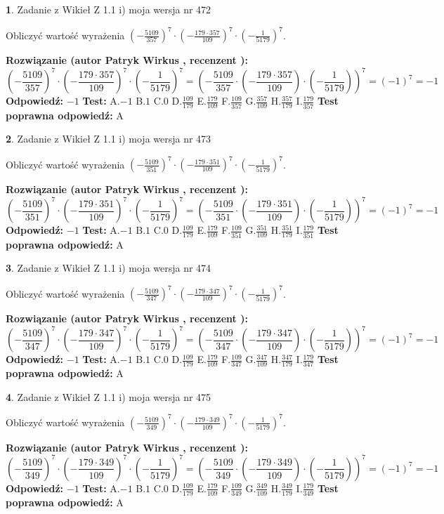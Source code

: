 \documentclass[12pt, a4paper]{article}
\theoremstyle{definition} %
\newtheorem{zad}{}
\newcommand{\zadStart}[1]{\begin{zad}#1\newline}
\newcommand{\zadStop}{\end{zad}}
\newcommand{\rozwStart}[2]{\noindent \textbf{Rozwiązanie (autor #1 , recenzent #2): }\newline}
\newcommand{\rozwStop}{\newline}
\newcommand{\odpStart}{\noindent \textbf{Odpowiedź:}\newline}
\newcommand{\odpStop}{\newline}
\newcommand{\testStart}{\noindent \textbf{Test:}\newline}
\newcommand{\testStop}{\newline}
\newcommand{\kluczStart}{\noindent \textbf{Test poprawna odpowiedź:}\newline}
\newcommand{\kluczStop}{\newline}
\begin{document}
\zadStart{Zadanie z Wikieł Z 1.1 i) moja wersja nr 472}

Obliczyć wartość wyrażenia $(-\frac{5109}{357})^{7} \cdot (-\frac{179 \cdot 357}{109})^{7} \cdot (-\frac{1}{5179})^{7}$.
\zadStop
\rozwStart{Patryk Wirkus}{}
$$(-\frac{5109}{357})^{7} \cdot (-\frac{179 \cdot 357}{109})^{7} \cdot (-\frac{1}{5179})^{7} = (-\frac{5109}{357} \cdot (-\frac{179 \cdot 357}{109}) \cdot (-\frac{1}{5179}))^{7} = (-1)^{7} = -1$$
\rozwStop
\odpStart
$-1$
\odpStop
\testStart
A.$-1$ B.$1$ C.$0$ D.$\frac{109}{179}$ E.$\frac{179}{109}$
F.$\frac{109}{357}$ G.$\frac{357}{109}$
H.$\frac{357}{179}$
I.$\frac{179}{357}$
\testStop
\kluczStart
A
\kluczStop



\zadStart{Zadanie z Wikieł Z 1.1 i) moja wersja nr 473}

Obliczyć wartość wyrażenia $(-\frac{5109}{351})^{7} \cdot (-\frac{179 \cdot 351}{109})^{7} \cdot (-\frac{1}{5179})^{7}$.
\zadStop
\rozwStart{Patryk Wirkus}{}
$$(-\frac{5109}{351})^{7} \cdot (-\frac{179 \cdot 351}{109})^{7} \cdot (-\frac{1}{5179})^{7} = (-\frac{5109}{351} \cdot (-\frac{179 \cdot 351}{109}) \cdot (-\frac{1}{5179}))^{7} = (-1)^{7} = -1$$
\rozwStop
\odpStart
$-1$
\odpStop
\testStart
A.$-1$ B.$1$ C.$0$ D.$\frac{109}{179}$ E.$\frac{179}{109}$
F.$\frac{109}{351}$ G.$\frac{351}{109}$
H.$\frac{351}{179}$
I.$\frac{179}{351}$
\testStop
\kluczStart
A
\kluczStop



\zadStart{Zadanie z Wikieł Z 1.1 i) moja wersja nr 474}

Obliczyć wartość wyrażenia $(-\frac{5109}{347})^{7} \cdot (-\frac{179 \cdot 347}{109})^{7} \cdot (-\frac{1}{5179})^{7}$.
\zadStop
\rozwStart{Patryk Wirkus}{}
$$(-\frac{5109}{347})^{7} \cdot (-\frac{179 \cdot 347}{109})^{7} \cdot (-\frac{1}{5179})^{7} = (-\frac{5109}{347} \cdot (-\frac{179 \cdot 347}{109}) \cdot (-\frac{1}{5179}))^{7} = (-1)^{7} = -1$$
\rozwStop
\odpStart
$-1$
\odpStop
\testStart
A.$-1$ B.$1$ C.$0$ D.$\frac{109}{179}$ E.$\frac{179}{109}$
F.$\frac{109}{347}$ G.$\frac{347}{109}$
H.$\frac{347}{179}$
I.$\frac{179}{347}$
\testStop
\kluczStart
A
\kluczStop



\zadStart{Zadanie z Wikieł Z 1.1 i) moja wersja nr 475}

Obliczyć wartość wyrażenia $(-\frac{5109}{349})^{7} \cdot (-\frac{179 \cdot 349}{109})^{7} \cdot (-\frac{1}{5179})^{7}$.
\zadStop
\rozwStart{Patryk Wirkus}{}
$$(-\frac{5109}{349})^{7} \cdot (-\frac{179 \cdot 349}{109})^{7} \cdot (-\frac{1}{5179})^{7} = (-\frac{5109}{349} \cdot (-\frac{179 \cdot 349}{109}) \cdot (-\frac{1}{5179}))^{7} = (-1)^{7} = -1$$
\rozwStop
\odpStart
$-1$
\odpStop
\testStart
A.$-1$ B.$1$ C.$0$ D.$\frac{109}{179}$ E.$\frac{179}{109}$
F.$\frac{109}{349}$ G.$\frac{349}{109}$
H.$\frac{349}{179}$
I.$\frac{179}{349}$
\testStop
\kluczStart
A
\kluczStop
\end{document}
